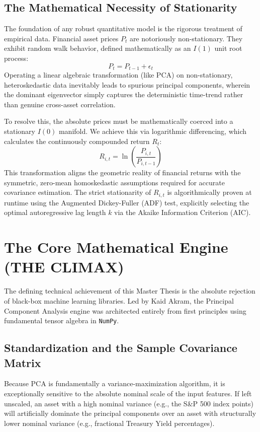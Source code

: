 \documentclass[12pt,twoside]{report}
\begin{document}
\section{The Mathematical Necessity of Stationarity}
The foundation of any robust quantitative model is the rigorous treatment of empirical data. Financial asset prices $P_t$ are notoriously non-stationary. They exhibit random walk behavior, defined mathematically as an $I(1)$ unit root process:
\begin{equation}
    P_t = P_{t-1} + \epsilon_t
\end{equation}
Operating a linear algebraic transformation (like PCA) on non-stationary, heteroskedastic data inevitably leads to spurious principal components, wherein the dominant eigenvector simply captures the deterministic time-trend rather than genuine cross-asset correlation.

To resolve this, the absolute prices must be mathematically coerced into a stationary $I(0)$ manifold. We achieve this via logarithmic differencing, which calculates the continuously compounded return $R_t$:
\begin{equation}
    R_{i,t} = \ln\left(\frac{P_{i,t}}{P_{i,t-1}}\right)
\end{equation}
This transformation aligns the geometric reality of financial returns with the symmetric, zero-mean homoskedastic assumptions required for accurate covariance estimation. The strict stationarity of $R_{i,t}$ is algorithmically proven at runtime using the Augmented Dickey-Fuller (ADF) test, explicitly selecting the optimal autoregressive lag length $k$ via the Akaike Information Criterion (AIC).

\chapter{The Core Mathematical Engine (THE CLIMAX)}
The defining technical achievement of this Master Thesis is the absolute rejection of black-box machine learning libraries. Led by Kaid Akram, the Principal Component Analysis engine was architected entirely from first principles using fundamental tensor algebra in \texttt{NumPy}.

\section{Standardization and the Sample Covariance Matrix}
Because PCA is fundamentally a variance-maximization algorithm, it is exceptionally sensitive to the absolute nominal scale of the input features. If left unscaled, an asset with a high nominal variance (e.g., the S\&P 500 index points) will artificially dominate the principal components over an asset with structurally lower nominal variance (e.g., fractional Treasury Yield percentages).
\end{document}
